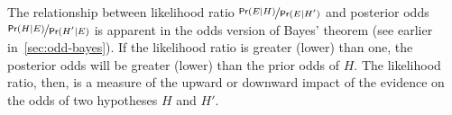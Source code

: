 \documentclass{article}
\newcommand{\pr}{\mathsf{Pr}}
\begin{document}


%
%
%

The relationship between likelihood ratio $\nicefrac{\pr(E \vert H)}{\pr(E \vert H')}$ and  posterior odds \linebreak $\nicefrac{\pr(H \vert E)}{\pr(H' \vert E)}$ is apparent in 
the odds version of Bayes' theorem (see earlier in~\ref{sec:odd-bayes}). %
If the likelihood ratio is greater (lower) than one, the posterior odds will be greater (lower) than the prior odds of $H$. The likelihood ratio, then, is a measure of the upward or downward impact of the evidence on the odds of two hypotheses $H$ and $H'$.

\end{document}
